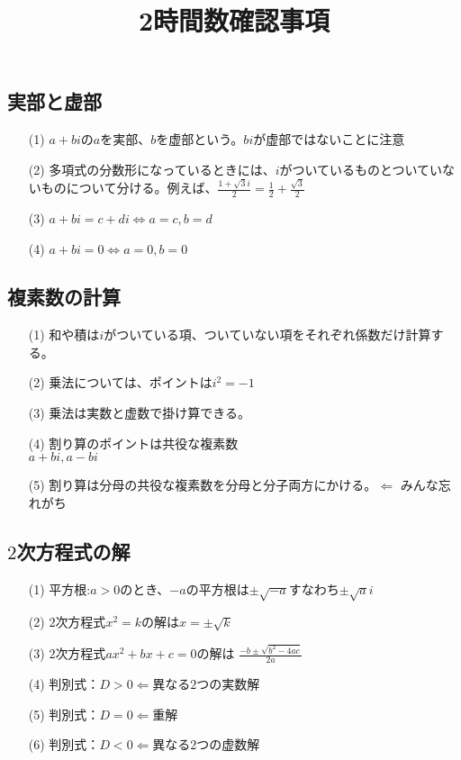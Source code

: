 \documentclass[twocolumn, 20pt]{jarticle}
\title{2時間数確認事項}
\begin{document}
\columnseprule=0.2mm
\date{}
\maketitle
\subsection*{実部と虚部}
\begin{itemize}
  \item[(1)]$a+bi$の$a$を実部、$b$を虚部という。$bi$が虚部ではないことに注意
  \item[(2)]多項式の分数形になっているときには、$i$がついているものとついていないものについて分ける。例えば、$\displaystyle\frac{1+\sqrt{3}i}{2} = \frac{1}{2}+\frac{\sqrt{3}}{2}$
  \item[(3)]$a+bi = c+di\Leftrightarrow a=c ,b=d$
  \item[(4)]$a+bi = 0 \Leftrightarrow a=0,b=0$
\end{itemize}
\subsection*{複素数の計算}
\begin{itemize}
  \item[(1)]和や積は$i$がついている項、ついていない項をそれぞれ係数だけ計算する。
  \item[(2)]乗法については、ポイントは{\Large{$i^2 = -1$}}
  \item[(3)]乗法は実数と虚数で掛け算できる。
  \item[(4)]割り算のポイントは共役な複素数\\ {\Large{$a+bi,a-bi$}}
  \item[(5)]割り算は分母の共役な複素数を{\LARGE{分母と分子両方}}にかける。$\Leftarrow$ みんな忘れがち
\end{itemize}
\subsection*{$2$次方程式の解}
\begin{itemize}
  \item[(1)]平方根:$a>0$のとき、$-a$の平方根は$\pm \sqrt{-a}$すなわち$\pm\sqrt{a}i$
  \item[(2)] $2$次方程式$x^2 = k$の解は$x=\pm\sqrt{k}$
  \item[(3)]$2$次方程式$ax^2+bx+c=0$の解は
  {\Large$\displaystyle\frac{-b\pm \sqrt{b^2 - 4ac}}{2a}$}
  \item[(4)]判別式：$D>0\Leftarrow$異なる$2$つの実数解
  \item[(5)]判別式：$D=0\Leftarrow$重解
  \item[(6)]判別式：$D<0\Leftarrow$異なる$2$つの虚数解
\end{itemize}
\newpage
\end{document}
